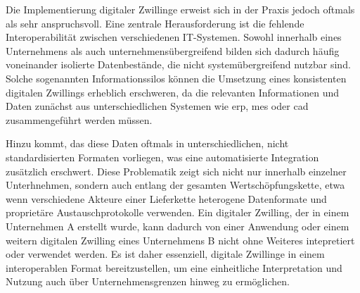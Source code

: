 


Die Implementierung digitaler Zwillinge erweist sich in der Praxis jedoch oftmals als sehr anspruchsvoll.
Eine zentrale Herausforderung ist die fehlende Interoperabilität zwischen verschiedenen IT-Systemen.
Sowohl innerhalb eines Unternehmens als auch unternehmensübergreifend bilden sich dadurch häufig voneinander isolierte Datenbestände, die nicht systemübergreifend nutzbar sind.
Solche sogenannten Informationssilos können die Umsetzung eines konsistenten digitalen Zwillings erheblich erschweren, da die relevanten Informationen und Daten zunächst aus unterschiedlichen Systemen wie \ac{erp}, \ac{mes} oder \ac{cad} zusammengeführt werden müssen.

Hinzu kommt, das diese Daten oftmals in unterschiedlichen, nicht standardisierten Formaten vorliegen, was eine automatisierte Integration zusätzlich erschwert.
Diese Problematik zeigt sich nicht nur innerhalb einzelner Unterhnehmen, sondern auch entlang der gesamten Wertschöpfungskette, etwa wenn verschiedene Akteure einer Lieferkette heterogene Datenformate und proprietäre Austauschprotokolle verwenden.
Ein digitaler Zwilling, der in einem Unternehmen A erstellt wurde, kann dadurch von einer Anwendung oder einem weitern digitalen Zwilling eines Unternehmens B nicht ohne Weiteres intepretiert oder verwendet werden.
Es ist daher essenziell, digitale Zwillinge in einem interoperablen Format bereitzustellen, um eine einheitliche Interpretation und Nutzung auch über Unternehmensgrenzen hinweg zu ermöglichen.
\cite{DTandAASConceptsInI4.0}




